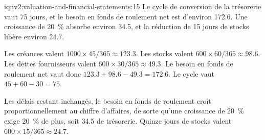 \begin{solution}{iq:iv2:valuation-and-financial-statements:15}
Le cycle de conversion de la trésorerie vaut 75 jours, et le besoin en fonds de roulement net est d'environ 172.6. Une croissance de 20~\% absorbe environ 34.5, et la réduction de 15 jours de stocks libère environ 24.7.

Les créances valent $1000 \times 45/365 \approx 123.3$. Les stocks valent $600 \times 60/365 \approx 98.6$. Les dettes fournisseurs valent $600 \times 30/365 \approx 49.3$. Le besoin en fonds de roulement net vaut donc $123.3 + 98.6 - 49.3 = 172.6$. Le cycle vaut $45 + 60 - 30 = 75$.

Les délais restant inchangés, le besoin en fonds de roulement croît proportionnellement au chiffre d'affaires, de sorte qu'une croissance de 20~\% exige 20~\% de plus, soit 34.5 de trésorerie. Quinze jours de stocks valent $600 \times 15/365 \approx 24.7$.

\end{solution}

